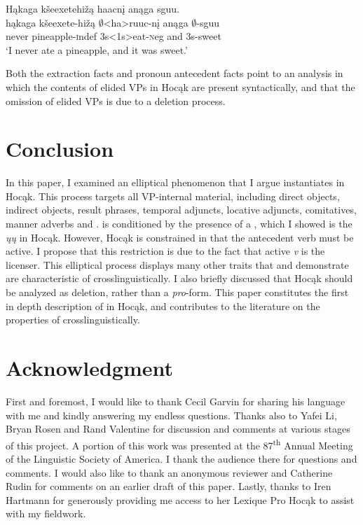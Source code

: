 \documentclass[output=paper]{LSP/langsci}
\begin{document}
\ea\label{ex:johnson:52} 
\glll Hąkaga kšeexetehižą haacnį anąga sguu.\\
hąkaga kšeexete-hižą $\emptyset$<ha>ruuc-nį anąga $\emptyset$-sguu\\
never pineapple-{\textsc indef} {\textsc 3s<1s>}eat-{\textsc neg} and {\textsc 3s}-sweet\\
\trans `I never ate a pineapple, and it was sweet.'
\z


Both the extraction facts and pronoun antecedent facts point to an analysis in which the contents of elided VPs in Hocąk are present syntactically, and that the omission of elided VPs is due to a deletion process.

\section{Conclusion}\label{sec:johnson:5}

In this paper, I examined an elliptical phenomenon that I argue instantiates  in Hocąk. This process targets all VP-internal material, including direct objects, indirect objects, result phrases, temporal adjuncts, locative adjuncts, comitatives, manner adverbs and  .  is conditioned by the presence of a , which I showed is the  \emph{ųų} in Hocąk. However, Hocąk  is constrained in that the antecedent verb must be active. I propose that this restriction is due to the fact that active \emph{v} is the licenser. This elliptical process displays many other traits that \citet{Goldberg2005} and \citet{Fortin2007} demonstrate are characteristic of  crosslinguistically. I also briefly discussed that Hocąk  should be analyzed as  deletion, rather than a  \emph{pro}-form. This paper constitutes the first in depth description of  in Hocąk, and contributes to the literature on the properties of  crosslinguistically. 

\section*{Acknowledgment}

First and foremost, I would like to thank Cecil Garvin for sharing his language with me and kindly answering my endless questions. Thanks also to Yafei Li, Bryan Rosen and Rand Valentine for discussion and comments at various stages of this project. A portion of this work was presented at the 87\textsuperscript{th} Annual Meeting of the Linguistic Society of America. I thank the audience there for questions and comments. I would also like to thank an anonymous reviewer and Catherine Rudin for comments on an earlier draft of this paper. Lastly, thanks to Iren Hartmann for generously providing me access to her Lexique Pro Hocąk  to assist with my fieldwork.
\end{document}
